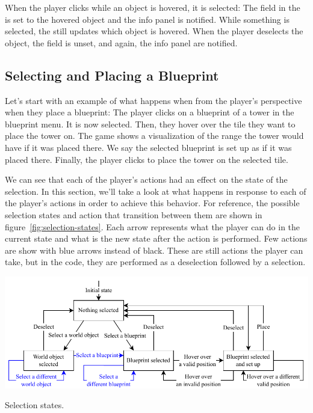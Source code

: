 When the player clicks while an object is hovered, it is selected:
The  field in the  is set to the hovered object and the info panel is notified.
While something is selected, the  still updates which object is hovered.
When the player deselects the object, the field is unset, and again, the info panel are notified.

\subsection{Selecting and Placing a Blueprint}\label{sec:place-blueprint}

Let's start with an example of what happens when from the player's perspective when they place a blueprint:
The player clicks on a blueprint of a tower in the blueprint menu.
It is now selected.
Then, they hover over the tile they want to place the tower on.
The game shows a visualization of the range the tower would have if it was placed there.
We say the selected blueprint is set up as if it was placed there.
Finally, the player clicks to place the tower on the selected tile.

We can see that each of the player's actions had an effect on the state of the selection.
In this section, we'll take a look at what happens in response to each of the player's actions in order to achieve this behavior.
For reference, the possible selection states and action that transition between them are shown in figure~\ref{fig:selection-states}.
Each arrow represents what the player can do in the current state and what is the new state after the action is performed.
Few actions are show with blue arrows instead of black.
These are still actions the player can take, but in the code, they are performed as a deselection followed by a selection.

\begin{center}
    \captionsetup{type=figure}
    \includegraphics[width=\textwidth]{img/selection states.pdf}
    \caption{Selection states.}
    \label{fig:selection-states}
\end{center}

